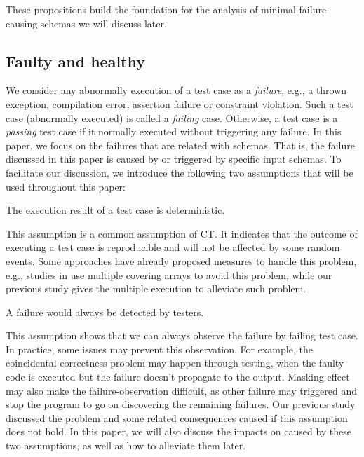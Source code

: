 These propositions build the foundation for the analysis of minimal failure-causing schemas we will discuss later.


\subsection{Faulty and healthy}\label{sec:back:failureandhealthy}

We consider any abnormally execution of a test case as a \emph{failure}, e.g., a thrown exception, compilation error, assertion failure or constraint violation. Such a test case (abnormally executed) is called a \emph{failing} case. Otherwise, a test case is a \emph{passing} test case if it normally executed without triggering any failure. In this paper, we focus on the failures that are related with schemas. That is, the failure discussed in this paper is caused by or triggered by specific input schemas.  To facilitate our discussion, we introduce the following two assumptions that will be used throughout this paper:

\begin{assumption}  The execution result of a test case is deterministic.
\end{assumption}

This assumption is a common assumption of CT\cite{zhang2011characterizing,ghandehari2012identifying,niu2013identifying}. It indicates that the outcome of executing a test case is reproducible and will not be affected by some random events. Some approaches have already proposed measures to handle this problem, e.g., studies in \cite{yilmaz2006covering,fouche2009incremental} use multiple covering arrays to avoid this problem, while our previous study gives the multiple execution to alleviate such problem.


\begin{assumption} A failure would always be detected by testers.
\end{assumption}

This assumption shows that we can always observe the failure by failing test case. In practice, some issues may prevent this observation. For example, the coincidental correctness problem \cite{Masri:2014:PCC:2582050.2559932} may happen through testing, when the faulty-code is executed but the failure doesn't propagate to the output. Masking effect \cite{yilmaz2013reducing} may also make the failure-observation difficult, as other failure may triggered and stop the program to go on discovering the remaining failures. Our previous study discussed the problem and some related consequences caused if this assumption does not hold. In this paper, we will also discuss the impacts on caused by these two assumptions, as well as how to alleviate them later.


